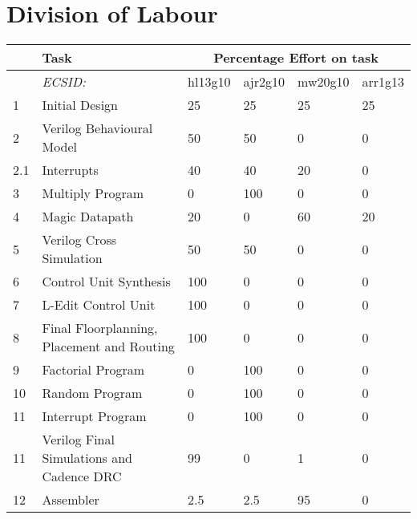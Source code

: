

\chapter{Division of Labour}


\begin{table}[!h]
\begin{tabular}{p{0.8cm}p{\textwidth-10.2cm}p{1.7cm}p{1.7cm}p{1.7cm}p{1.7cm}}
     & Task             & \multicolumn{4}{c}{Percentage Effort on task} \\ \hline
     &  \textit{ECSID:}					& hl13g10 & ajr2g10 & mw20g10 & arr1g13 \\ \hline
1    & Initial Design					& 25	& 25	& 25 	& 25 \\ \hline 
2    & Verilog Behavioural Model			& 50	& 50	& 0 	& 0 \\ \hline 
2.1  & Interrupts 					& 40	& 40 	& 20 	& 0 \\ 
3    & Multiply Program					& 0	& 100	& 0 	& 0 \\ \hline 
4    & Magic Datapath					& 20	& 0	& 60 	& 20 \\ 
5    & Verilog Cross Simulation				& 50	& 50	& 0 	& 0 \\ \hline 
6    & Control Unit Synthesis				& 100	& 0	& 0 	& 0 \\ \hline 
7    & L-Edit Control Unit				& 100	& 0	& 0 	& 0 \\ \hline 
8    & Final Floorplanning, Placement and Routing	& 100	& 0	& 0 	& 0 \\ \hline 
9    & Factorial Program				& 0	& 100	& 0 	& 0 \\ \hline 
10   & Random Program					& 0	& 100	& 0 	& 0 \\ \hline 
11   & Interrupt Program				& 0	& 100	& 0 	& 0 \\ \hline 
11   & Verilog Final Simulations and Cadence DRC	& 99	& 0	& 1 	& 0 \\ \hline 
12   & Assembler					& 2.5	& 2.5	& 95 	& 0 \\ \hline 

\end{tabular}
\end{table}
